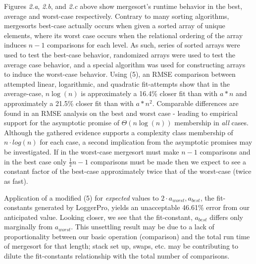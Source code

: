 \documentclass[11pt,letterpaper]{report}
\begin{document}
Figures \emph{2.a}, \emph{2.b}, and \emph{2.c} above show mergesort's runtime behavior in the best, average and worst-case respectively. Contrary to many sorting algorithms, mergesorts best-case actually occurs when given a sorted array of unique elements, where its worst case occurs when the relational ordering of the array induces $n-1$ comparisons for each level. As such, series of sorted arrays were used to test the best-case behavior, randomized arrays were used to test the average case behavior, and a special algorithm was used for constructing arrays to induce the worst-case behavior.
Using (5), an RMSE comparison between attempted linear, logarithmic, and quadratic fit-attempts show that in the average-case, $n\log{}(n)$ is approximately a 16.4\% closer fit than with $a*n$ and approximately a 21.5\% closer fit than with $a*n^2$. Comparable differences are found in an RMSE analysis on the best and worst case - leading to empirical support for the asymptotic promise of $\Theta(n\log{}(n))$ membership in \emph{all} cases.
Although the gathered evidence supports a complexity class membership of $n \cdot log{}(n)$ for each case, a second implication from the asymptotic promises may be investigated. If in the worst-case mergesort must make $n-1$ comparisons and in the best case only $\frac{1}{2}n-1$ comparisons must be made then we expect to see a constant factor of the best-case approximately twice that of the worst-case (twice as fast). 

Application of a modified (5) for \emph{expected} values to $2 \cdot a_{worst}, a_{best}$, the fit-constants generated by LoggerPro, yields an unacceptable 46.61\% error from our anticipated value. Looking closer, we see that the fit-constant, $a_{best}$ differs only marginally from $a_{worst}$. This unsettling result may be due to a lack of proportionality between our basic operation (comparison) and the total run time of mergesort for that length; stack set up, swaps, etc. may be contributing to dilute the fit-constants relationship with the total number of comparisons.
\end{document}
